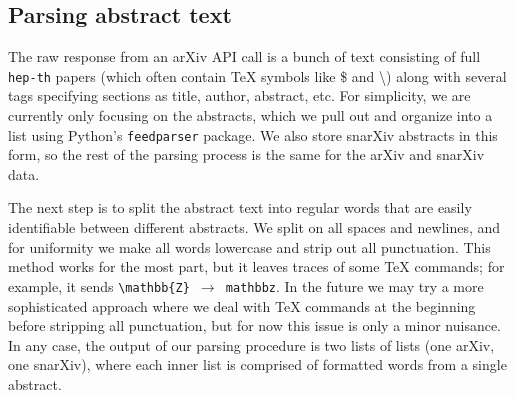 \documentclass{article}
\begin{document}
\subsection{Parsing abstract text}
The raw response from an arXiv API call is a bunch of text consisting of full \texttt{hep-th} papers (which often contain TeX symbols like \$ and  \textbackslash) along with several tags specifying sections as title, author, abstract, etc.
For simplicity, we are currently only focusing on the abstracts, which we pull out and organize into a list using Python's \texttt{feedparser} package.
We also store snarXiv abstracts in this form, so the rest of the parsing process is the same for the arXiv and snarXiv data.

The next step is to split the abstract text into regular words that are easily identifiable between different abstracts.
We split on all spaces and newlines, and for uniformity we make all words lowercase and strip out all punctuation.
This method works for the most part, but it leaves traces of some TeX commands; for example, it sends \texttt{\textbackslash mathbb\{Z\} $\to$ mathbbz}.
In the future we may try a more sophisticated approach where we deal with TeX commands at the beginning before stripping all punctuation, but for now this issue is only a minor nuisance.
In any case, the output of our parsing procedure is two lists of lists (one arXiv, one snarXiv), where each inner list is comprised of formatted words from a single abstract.
\end{document}
